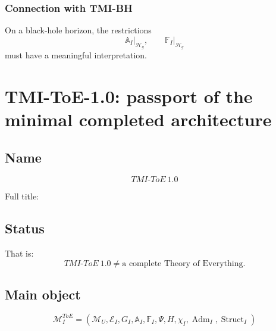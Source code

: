 \documentclass[12pt,a4paper]{article}
\newcommand{\Adm}{\operatorname{Adm}}
\newcommand{\Struct}{\operatorname{Struct}}
\begin{document}
\subsubsection*{Connection with TMI-BH}
On a black-hole horizon, the restrictions
\[
\boxed{\mathbb A_I|_{\mathcal H_g}},\qquad
\boxed{\mathbb F_I|_{\mathcal H_g}}
\]
must have a meaningful interpretation.

\section{TMI-ToE-1.0: passport of the minimal completed architecture}

\subsection{Name}

\[
\boxed{TMI\mbox{-}ToE\ 1.0}
\]

Full title:
\begin{center}
\end{center}

\subsection{Status}

\begin{center}
\end{center}

That is:
\[
\boxed{TMI\mbox{-}ToE\ 1.0\neq\text{a complete Theory of Everything}}.
\]

\subsection{Main object}

\[
\boxed{
\mathcal M_I^{ToE}=
(\mathcal M_U,\mathcal E_I,G_I,\mathbb A_I,\mathbb F_I,\Psi,H,\chi_I,\Adm_I,\Struct_I)
}
\]
\end{document}
